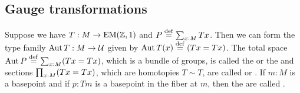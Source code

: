 \subsection{Gauge transformations}
\begin{mydef}
\label{sec:automorphisms}
Suppose we have \( T:M\to\mathrm{EM}(\mathbb{Z},1) \) and \( P\stackrel{\mathrm{def}}{=}\sum_{x:M}Tx \). Then we can form the type family \( \operatorname{Aut} T:M\to\mathcal{U} \) given by \( \operatorname{Aut} T(x)\stackrel{\mathrm{def}}{=}(Tx=Tx) \). The total space \( \operatorname{Aut} P\stackrel{\mathrm{def}}{=}\sum_{x:M}(Tx=Tx) \), which is a bundle of groups, is called the  or the  and sections \( \prod_{x:M}(Tx=Tx) \), which are homotopies \( T\sim T \), are called  or . If \( m:M \) is a basepoint and if \( p:Tm \) is a basepoint in the fiber at \( m \), then the  are called .
\end{mydef}

